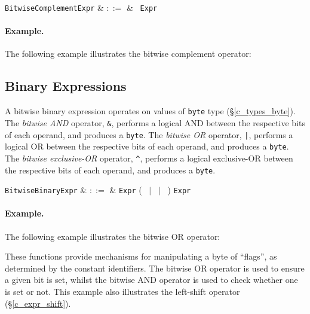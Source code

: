\begin{syntax}
\verb+BitwiseComplementExpr+ & $::=$ & \token{$\sim$}\ \verb+Expr+\\
\end{syntax}

\paragraph{Example.}  The following example illustrates the bitwise complement operator:



\subsection{Binary Expressions}
\label{c_expr_bitwise_binary}
A bitwise binary expression operates on values of \lstinline{byte} type (\S\ref{c_types_byte}).  The {\em bitwise AND} operator, \lstinline{&}, performs a logical AND between the respective bits of each operand, and produces a \lstinline{byte}.   The {\em bitwise OR} operator, \lstinline{|}, performs a logical OR between the respective bits of each operand, and produces a \lstinline{byte}.  The {\em bitwise exclusive-OR} operator, \lstinline{^}, performs a logical exclusive-OR between the respective bits of each operand, and produces a \lstinline{byte}.

\begin{syntax}
  \verb+BitwiseBinaryExpr+ & $::=$ & \verb+Expr+ \big(\ \token{\&} $|$ \token{|}\ $|$ \token{\^}\ \big) \verb+Expr+\\
\end{syntax}

\paragraph{Example.}  The following example illustrates the bitwise OR operator:



These functions provide mechanisms for manipulating a byte of ``flags'', as determined by the constant identifiers.  The bitwise OR operator is used to ensure a given bit is set, whilst the bitwise AND operator is used to check whether one is set or not.  This example also illustrates the left-shift operator (\S\ref{c_expr_shift}).


